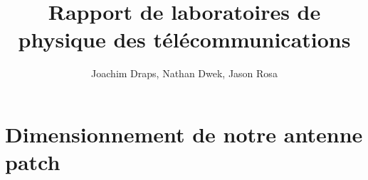 \documentclass[a4paper, 11pt, frenchb]{article}
\title{Rapport de laboratoires de physique des télécommunications}
\author{Joachim Draps, Nathan Dwek, Jason Rosa}
\begin{document}
\maketitle
\tableofcontents

\section{Dimensionnement de notre antenne patch}

\end{document}

